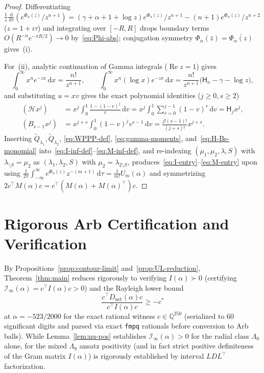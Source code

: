 \documentclass[11pt, reqno]{amsart}
\theoremstyle{remark}
\numberwithin{equation}{section}
\DeclareMathOperator{\re}{Re}
\newcommand{\Harm}{\mathsf{H}}
\newcommand{\cH}{\mathcal{H}}
\newcommand{\dd}{\,\mathrm{d}}
\begin{document}
\begin{proof}
Differentiating $\frac{1}{i}\frac{\dd}{\dd\tau}(e^{\Phi_\alpha(z)}/z^{n+1})
= (\gamma+\alpha+1+\log z)e^{\Phi_\alpha(z)}/z^{n+1} - (n+1)e^{\Phi_\alpha(z)}/z^{n+2}$ ($z=1+i\tau$)
and integrating over $[-R, R]$ drops boundary terms $O(R^{-n} e^{-\pi R/2}) \to 0$ by~\eqref{eq:Phi-abs};
conjugation symmetry $\Phi_\alpha(\bar{z}) = \overline{\Phi_\alpha(z)}$ gives~(i).

For~(ii), analytic continuation of Gamma integrals ($\re z = 1$) gives
\begin{equation}\label{eq:gamma-moments}
\int_0^\infty x^n e^{-zx}\dd x = \frac{n!}{z^{n+1}},
\qquad
\int_0^\infty x^n (\log x) e^{-zx}\dd x
= \frac{n!}{z^{n+1}}\bigl(\Harm_n - \gamma - \log z\bigr),
\end{equation}
and substituting $u = x v$ gives the exact polynomial identities ($j \ge 0, s \ge 2$)
\begin{align}
(\cH x^j) &= x^j \int_0^1 \frac{1 - (1-v)^j}{v}\dd v
= x^j \int_0^1 \sum_{r=0}^{j-1}(1-v)^r\dd v = \Harm_j x^j, \nonumber\\
(B_{s-1} x^j) &= x^{j+s}\int_0^1 (1-v)^j v^{s-1}\dd v
= \frac{j!(s-1)!}{(j+s)!} x^{j+s}. \label{eq:H-Bs-monomial}
\end{align}
Inserting $\widetilde{Q}_{\lambda_1}, \widetilde{Q}_{\lambda_2}$, \eqref{eq:WPPP-def}, \eqref{eq:gamma-moments},
and~\eqref{eq:H-Bs-monomial} into~\eqref{eq:I-inf-def}--\eqref{eq:M-inf-def}, and re-indexing
$(\mu_1,\mu_2,\lambda,S)$ with $\lambda_{\setminus S} = \mu_2$ as $(\lambda_1,\lambda_2,S)$ with
$\mu_2 = \lambda_{2\setminus S}$, produces~\eqref{eq:I-entry}--\eqref{eq:M-entry} upon using
$\frac{1}{2\pi}\int_{-\infty}^\infty e^{\Phi_\alpha(z)} z^{-(m+1)}\dd\tau = \frac{1}{m!}U_m(\alpha)$
and symmetrizing $2 c^\top M(\alpha) c = c^\top(M(\alpha)+M(\alpha)^\top)c$.
\end{proof}

\section{Rigorous Arb Certification and Verification}\label{sec:cert}

By Propositions~\ref{prop:contour-limit} and~\ref{prop:UL-reduction}, Theorem~\ref{thm:main}
reduces rigorously to verifying $I(\alpha) \succ 0$ (certifying $\mathcal{I}_\infty(\alpha) = c^\top I(\alpha) c > 0$)
and the Rayleigh lower bound
\begin{equation}\label{eq:rq-cert}
\frac{c^\top D_{\mathrm{net}}(\alpha) c}{c^\top I(\alpha) c} \ge -c^*
\end{equation}
at $\alpha = -523/2000$ for the exact rational witness $c \in \mathbb{Q}^{250}$ (serialized to $60$
significant digits and parsed via exact \texttt{fmpq} rationals before conversion to Arb balls).
While Lemma~\ref{lem:nu-pos} establishes $\mathcal{I}_\infty(\alpha) > 0$ for the radial class
$\Lambda_0$ alone, for the mixed $\Lambda_9$ ansatz positivity (and in fact strict positive
definiteness of the Gram matrix $I(\alpha)$) is rigorously established by interval $LDL^\top$
factorization.
\end{document}
